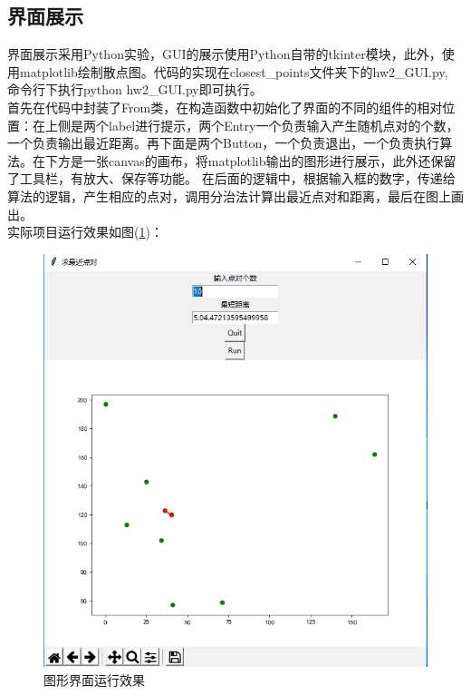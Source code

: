 \documentclass[UTF8]{ctexart}
\begin{document}
\subsection{界面展示}

界面展示采用Python实验，GUI的展示使用Python自带的tkinter模块，此外，使用matplotlib绘制散点图。代码的实现在closest\_points文件夹下的hw2\_GUI.py, 命令行下执行python hw2\_GUI.py即可执行。\\

首先在代码中封装了From类，在构造函数中初始化了界面的不同的组件的相对位置：在上侧是两个label进行提示，两个Entry一个负责输入产生随机点对的个数，一个负责输出最近距离。再下面是两个Button，一个负责退出，一个负责执行算法。在下方是一张canvas的画布，将matplotlib输出的图形进行展示，此外还保留了工具栏，有放大、保存等功能。
在后面的逻辑中，根据输入框的数字，传递给算法的逻辑，产生相应的点对，调用分治法计算出最近点对和距离，最后在图上画出。\\

实际项目运行效果如图(\ref{img1-4})：

\begin{figure}[H]
    \centering
    \includegraphics[width=1\textwidth]{img/1-4.png}
    \caption{图形界面运行效果}
    \label{img1-4}
\end{figure}
\end{document}
